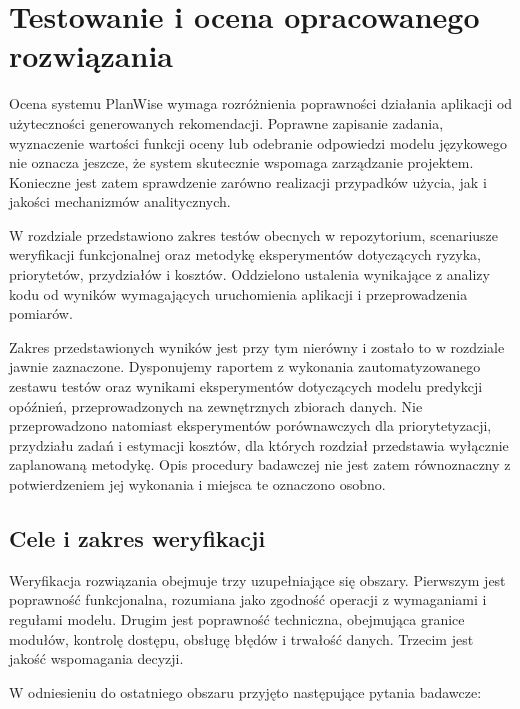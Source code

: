 \chapter{Testowanie i ocena opracowanego rozwiązania}
\label{chap:testowanie}

Ocena systemu PlanWise wymaga rozróżnienia poprawności działania aplikacji od użyteczności generowanych rekomendacji. Poprawne zapisanie zadania, wyznaczenie wartości funkcji oceny lub odebranie odpowiedzi modelu językowego nie oznacza jeszcze, że system skutecznie wspomaga zarządzanie projektem. Konieczne jest zatem sprawdzenie zarówno realizacji przypadków użycia, jak i jakości mechanizmów analitycznych.

W rozdziale przedstawiono zakres testów obecnych w repozytorium, scenariusze weryfikacji funkcjonalnej oraz metodykę eksperymentów dotyczących ryzyka, priorytetów, przydziałów i kosztów. Oddzielono ustalenia wynikające z analizy kodu od wyników wymagających uruchomienia aplikacji i przeprowadzenia pomiarów.

Zakres przedstawionych wyników jest przy tym nierówny i zostało to w rozdziale jawnie zaznaczone. Dysponujemy raportem z wykonania zautomatyzowanego zestawu testów oraz wynikami eksperymentów dotyczących modelu predykcji opóźnień, przeprowadzonych na zewnętrznych zbiorach danych. Nie przeprowadzono natomiast eksperymentów porównawczych dla priorytetyzacji, przydziału zadań i estymacji kosztów, dla których rozdział przedstawia wyłącznie zaplanowaną metodykę. Opis procedury badawczej nie jest zatem równoznaczny z potwierdzeniem jej wykonania i miejsca te oznaczono osobno.

\section{Cele i zakres weryfikacji}

Weryfikacja rozwiązania obejmuje trzy uzupełniające się obszary. Pierwszym jest poprawność funkcjonalna, rozumiana jako zgodność operacji z wymaganiami i regułami modelu. Drugim jest poprawność techniczna, obejmująca granice modułów, kontrolę dostępu, obsługę błędów i trwałość danych. Trzecim jest jakość wspomagania decyzji.

W odniesieniu do ostatniego obszaru przyjęto następujące pytania badawcze:

